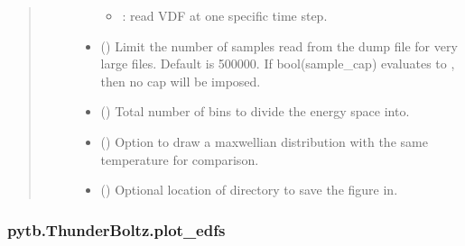 \documentclass[letterpaper,10pt,english,openany,oneside]{sphinxmanual}
\begin{document}
\begin{fulllineitems}
\begin{fulllineitems}
\begin{quote}
\begin{description}
\begin{itemize}
\begin{itemize}
\item {} 
\sphinxAtStartPar
{}: read VDF at one specific time step.

\end{itemize}


\item {} 
\sphinxAtStartPar
{} () \textendash{} Limit the number of samples read from the dump
file for very large files. Default is 500000. If bool(sample\_cap)
evaluates to , then no cap will be imposed.

\item {} 
\sphinxAtStartPar
{} () \textendash{} Total number of bins to divide the energy space into.

\item {} 
\sphinxAtStartPar
{} () \textendash{} Option to draw a maxwellian distribution
with the same temperature for comparison.

\item {} 
\sphinxAtStartPar
{} () \textendash{} Optional location of directory to save the figure in.

\end{itemize}

\end{description}\end{quote}

\end{fulllineitems}


\sphinxstepscope


\subsubsection{pytb.ThunderBoltz.plot\_edfs}
\label{\detokenize{api/pytb.ThunderBoltz.plot_edfs:pytb-thunderboltz-plot-edfs}}\label{\detokenize{api/pytb.ThunderBoltz.plot_edfs::doc}}


\end{fulllineitems}
\end{document}
